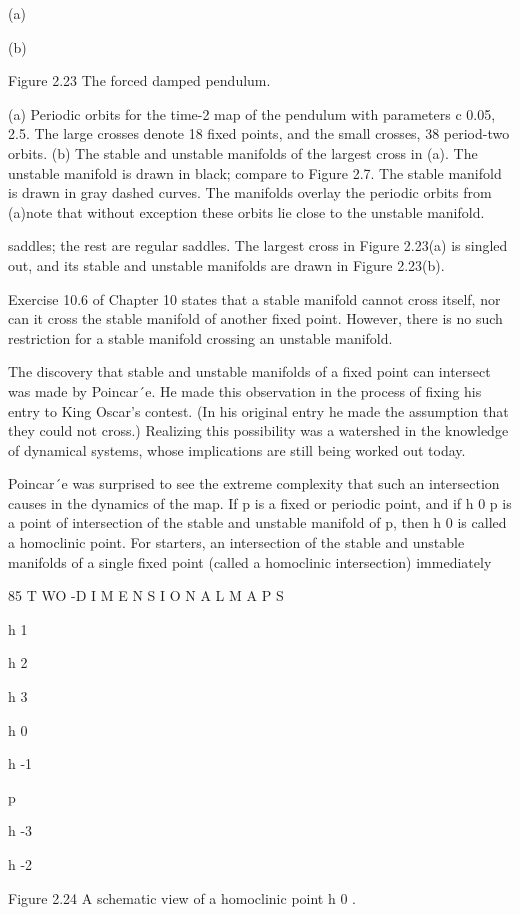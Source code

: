 \documentclass[12pt]{article}
\begin{document}
(a)

(b)

Figure 2.23 The forced damped pendulum.

(a) Periodic orbits for the time-2  map of the pendulum with parameters c  0.05, 
  2.5. The large crosses denote 18 ﬁxed points, and the small crosses, 38 period-two orbits. (b) The stable and unstable manifolds 
of the largest cross in (a). The unstable manifold is drawn in black; compare to Figure 2.7. The stable manifold is drawn in gray 
dashed curves. The manifolds overlay the periodic orbits from (a)note that without exception these orbits lie close to the unstable 
manifold.

saddles; the rest are regular saddles. The largest cross in Figure 2.23(a) is singled out, and its stable and unstable manifolds are 
drawn in Figure 2.23(b).

Exercise 10.6 of Chapter 10 states that a stable manifold cannot cross itself, nor can it cross the stable manifold of another ﬁxed 
point. However, there is no such restriction for a stable manifold crossing an unstable manifold.

The discovery that stable and unstable manifolds of a ﬁxed point can intersect was made by Poincar´e. He made this observation in 
the process of ﬁxing his entry to King Oscar’s contest. (In his original entry he made the assumption that they could not cross.) 
Realizing this possibility was a watershed in the knowledge of dynamical systems, whose implications are still being worked out 
today.

Poincar´e was surprised to see the extreme complexity that such an intersection causes in the dynamics of the map. If p is a ﬁxed or 
periodic point, and if h 0  p is a point of intersection of the stable and unstable manifold of p, then h 0 is called a homoclinic 
point. For starters, an intersection of the stable and unstable manifolds of a single ﬁxed point (called a homoclinic intersection) 
immediately

85 T WO -D I M E N S I O N A L M A P S

h 1

h 2

h 3

h 0

h -1

p

h -3

h -2

Figure 2.24 A schematic view of a homoclinic point h 0 .
\end{document}

